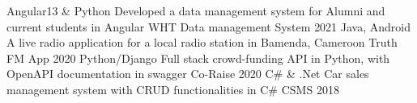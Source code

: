 \begin{cvhonors}
  \cvhonor
    {Angular13 \& Python}
    {Developed a data management system for Alumni and current students in Angular}
    {WHT Data management System}
    {2021}
    \cvhonor
    {Java, Android}
    {A live radio application for a local radio station in Bamenda, Cameroon}
    {Truth FM App}
    {2020}
  \cvhonor
    {Python/Django}
    {Full stack crowd-funding API in Python, with OpenAPI documentation in swagger}
    {Co-Raise}
    {2020}
  \cvhonor
    {C\# \& .Net}
    {Car sales management system with CRUD functionalities in C\#}
    {CSMS}
    {2018}
\end{cvhonors}
